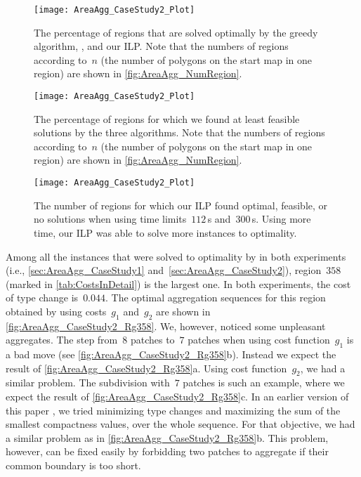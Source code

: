 \documentclass[acmsmall,natbib=false]{acmart}
\begin{document}
\begin{figure}[tb]
\centering
\texttt{[image: AreaAgg\_CaseStudy2\_Plot]}
\caption{The percentage of regions that are solved 
	optimally by the greedy algorithm, \Astar, and our ILP.
	Note that the numbers of regions according to~$n$ 
	(the number of polygons on the start map in one region) 
	are shown in \fig\ref{fig:AreaAgg_NumRegion}.}
\label{fig:AreaAgg_CaseStudy2_Percentage_Optimal}
%
\par\vspace{\baselineskip} %
%
\centering
\texttt{[image: AreaAgg\_CaseStudy2\_Plot]}
\caption{The percentage of regions for which we found at 
	least feasible solutions by the three algorithms.
	Note that the numbers of regions according to~$n$ 
	(the number of polygons on the start map in one region) 
	are shown in \fig\ref{fig:AreaAgg_NumRegion}.}
\label{fig:AreaAgg_CaseStudy2_Percentage_Feasible}
\end{figure}

\begin{figure}[tb]
\centering
\texttt{[image: AreaAgg\_CaseStudy2\_Plot]}
\caption{The number of regions for which
	our ILP found optimal, feasible, or no solutions 
	when using time limits~$112\,$s and~$300\,$s.
	Using more time, our ILP was able to 
	solve more instances to optimality.}
\label{fig:AreaAgg_CaseStudy2_ILP}
\end{figure}

Among all the instances that were solved to optimality by \Astar
in both experiments (i.e., \sects\ref{sec:AreaAgg_CaseStudy1} 
and~\ref{sec:AreaAgg_CaseStudy2}),
region~$358$
(marked in \tab\ref{tab:CostsInDetail})
is the largest one.
In both experiments, the cost of type change is~$0.044$.
The optimal aggregation sequences for this region
obtained by using costs~$g_1$ and~$g_2$
are shown in \fig\ref{fig:AreaAgg_CaseStudy2_Rg358}.
We, however, noticed some unpleasant aggregates.
The step from~$8$ patches to~$7$ patches 
when using cost function~$g_1$ is a bad move
(see \fig\ref{fig:AreaAgg_CaseStudy2_Rg358}b).
Instead we expect the result of 
\fig\ref{fig:AreaAgg_CaseStudy2_Rg358}a.
Using cost function~$g_2$, we had a similar problem. 
The subdivision with~$7$ patches is such an example,
where we expect the result of 
\fig\ref{fig:AreaAgg_CaseStudy2_Rg358}c.
In an earlier version of this paper \parencite{Peng2017AStar},
we tried minimizing type changes 
and maximizing the sum of the smallest compactness values, 
over the whole sequence.
For that objective, we had a similar problem as 
in \fig\ref{fig:AreaAgg_CaseStudy2_Rg358}b.
This problem, however, can be fixed easily 
by forbidding two patches to aggregate 
if their common boundary is too short.
\end{document}
